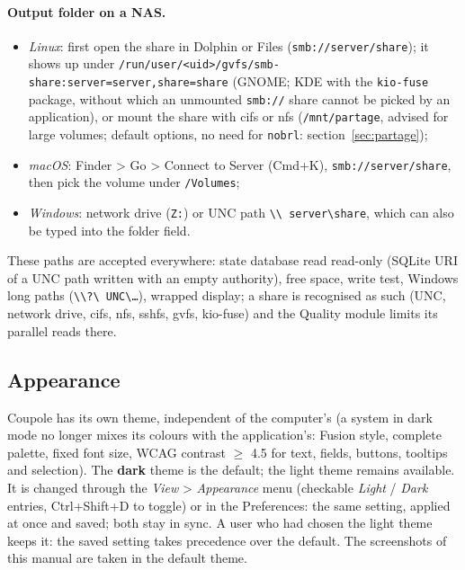 \paragraph{Output folder on a NAS.}
\begin{itemize}[nosep]
\item \emph{Linux}: first open the share in Dolphin or Files (\texttt{smb://server/share}); it shows up under
  \texttt{/run/user/<uid>/gvfs/smb-share:server=server,share=share} (GNOME; KDE with the \texttt{kio-fuse} package,
  without which an unmounted \texttt{smb://} share cannot be picked by an application), or mount the share with cifs
  or nfs (\texttt{/mnt/partage}, advised for large volumes; default options, no need for \texttt{nobrl}: section~\ref{sec:partage});
\item \emph{macOS}: Finder > Go > Connect to Server (Cmd+K), \texttt{smb://server/share}, then pick the volume under
  \texttt{/Volumes};
\item \emph{Windows}: network drive (\texttt{Z:}) or UNC path \texttt{\textbackslash\textbackslash
  server\textbackslash share}, which can also be typed into the folder field.
\end{itemize}
These paths are accepted everywhere: state database read read-only (SQLite URI of a UNC path written with an empty
authority), free space, write test, Windows long paths (\texttt{\textbackslash\textbackslash?\textbackslash
UNC\textbackslash…}), wrapped display; a share is recognised as such (UNC, network drive, cifs, nfs, sshfs, gvfs,
kio-fuse) and the Quality module limits its parallel reads there.

\subsection{Appearance}\label{sec:apparence}
Coupole has its own theme, independent of the computer's (a system in dark mode no longer mixes its colours with the
application's: Fusion style, complete palette, fixed font size, WCAG contrast $\geq$ 4.5 for text, fields, buttons,
tooltips and selection). The \textbf{dark} theme is the default; the light theme remains available. It is changed
through the \emph{View} > \emph{Appearance} menu (checkable \emph{Light} / \emph{Dark} entries, Ctrl+Shift+D to
toggle) or in the Preferences: the same setting, applied at once and saved; both stay in sync. A user who had chosen
the light theme keeps it: the saved setting takes precedence over the default. The screenshots of this manual are
taken in the default theme.

